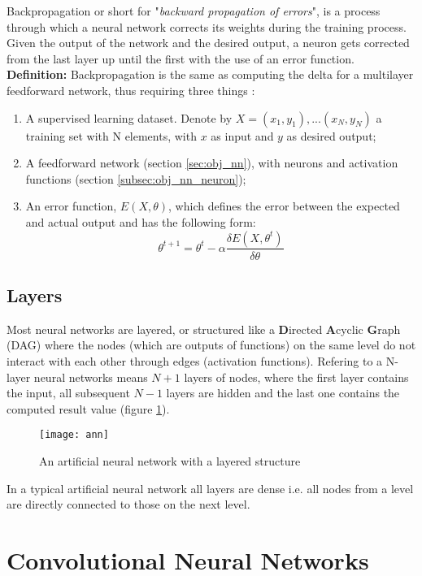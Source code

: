 Backpropagation or short for "\textit{backward propagation of errors}", is a process through which a neural network corrects its weights during the training process. Given the output of the network and the desired output, a neuron gets corrected from the last layer up until the first with the use of an error function.
\textbf{Definition:} Backpropagation is the same as computing the delta for a multilayer feedforward network, thus requiring three things \cite{brilliant:backpropagation}:  

\begin{enumerate}
\item{A supervised learning dataset. Denote by $X = (x_1, y_1), ... (x_N, y_N)$ a training set with N elements, with $x$ as input and $y$ as desired output;}
\item{A feedforward network (section \ref{sec:obj_nn}), with neurons and activation functions (section \ref{subsec:obj_nn_neuron});}
\item{An error function, $E(X, \theta)$, which defines the error between the expected and actual output and has the following form: \[ \theta^{t+1} = \theta^t - \alpha \frac{\delta E(X, \theta^t)}{\delta \theta} \]}
\end{enumerate}

\subsection{Layers}
\label{subsec:obj_nn_layers}

Most neural networks are layered, or structured like a \textbf{D}irected \textbf{A}cyclic \textbf{G}raph (DAG) where the nodes (which are outputs of functions) on the same level do not interact with each other through edges (activation functions). Refering to a N-layer neural networks means $N+1$ layers of nodes, where the first layer contains the input, all subsequent $N-1$ layers are hidden and the last one contains the computed result value (figure \ref{fig:ann}).

\begin{figure}[b!]
\centering
\texttt{[image: ann]}
\caption{An artificial neural network with a layered structure}
\label{fig:ann}
\end{figure}

In a typical artificial neural network all layers are dense i.e. all nodes from a level are directly connected to those on the next level.

\section{Convolutional Neural Networks}
\label{sec:obj_cnn}

